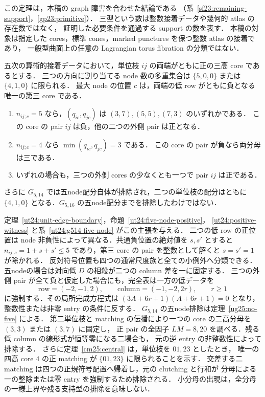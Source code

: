 この定理は，本稿の graph 障害を合わせた結論である
（系~\ref{sf23:remaining-support}，\ref{gp23:primitive}）．
三型という数は整数接着データや幾何的 atlas の存在数ではなく，
証明した必要条件を通過する support の数を表す．
本稿の対象は指定した cores，標準 cones，marked punctures を保つ整数 atlas の接着であり，
一般型曲面上の任意の Lagrangian torus fibration の分類ではない．

\begin{theorem}
\label{ar24:unit-edge-boundary}
五次の算術的接着データにおいて，単位枝 $ij$ の両端がともに正の三高 core であるとする．
三つの方向に割り当てる node 数の多重集合は $\{5,0,0\}$ または $\{4,1,0\}$ に限られる．
最大 node の位置 $c$ は，両端の低 row がともに負となる唯一の第三 core である．
\begin{enumerate}
\item $n_{ij;c}=5$ なら，$(q_{ic},q_{jc})$ は $(3,7),(5,5),(7,3)$ のいずれかである．
この core の pair $ij$ は負，他の二つの外側 pair は正となる．
\item $n_{ij;c}=4$ なら $\min(q_{ic},q_{jc})=3$ である．
この core の pair が負なら両分母は三である．
\item いずれの場合も，三つの外側 cores の少なくとも一つで pair $ij$ は正である．
\end{enumerate}
さらに $G_{5,14}$ では五node配分自体が排除され，二つの単位枝の配分はともに
$\{4,1,0\}$ となる．$G_{5,16}$ の五node配分までを排除したわけではない．
\end{theorem}

定理~\ref{ut24:unit-edge-boundary}，命題~\ref{ut24:five-node-positive}，
\ref{ut24:positive-witness} と系~\ref{ut24:g514-five-node} がこの主張を与える．
二つの低 row の正位置は node 非負性によって異なる．共通負位置の絶対値を $s,s'$ とすると
$n_{ij;c}=1+s+s'\le5$ であり，第三 core の pair を整数として解くと $s=s'=1$ が除かれる．
反対符号位置も四つの通常尺度族と全ての小例外へ分類できる．
五nodeの場合は対向低 $D$ の相殺が二つの column 差を一に固定する．
三つの外側 pair が全て負と仮定した場合にも，完全表は一方の低データを
\[
 \text{row}=(-2,-1,2),\qquad \text{column}=(-1,-2,2r),\qquad r\ge1
\]
に強制する．その局所完成方程式は
$(3A+6r+1)(A+6r+1)=0$ となり，整数性または非零 entry の条件に反する．
$G_{5,14}$ の五node排除は定理~\ref{ug25:no-five} による．
第二単位枝と matching の伝播により一つの core の二高分母を $(3,3)$ または $(3,7)$ に固定し，
正 pair の全因子 $LM=8,20$ を調べる．残る低 column の線形式が恒等零になる二場合も，
元の逆 entry の非整数性によって排除する．
さらに定理~\ref{cm25:central} は，単位枝を $01,23$ としたとき，
唯一の四高 core $4$ の正 matching が $\{01,23\}$ に限られることを示す．
交差する二 matching は四つの正規符号配置へ帰着し，元の clutching と行和が
分母による一の整除または零 entry を強制するため排除される．
小分母の出現は，全分母の一様上界や残る支持型の排除を意味しない．


